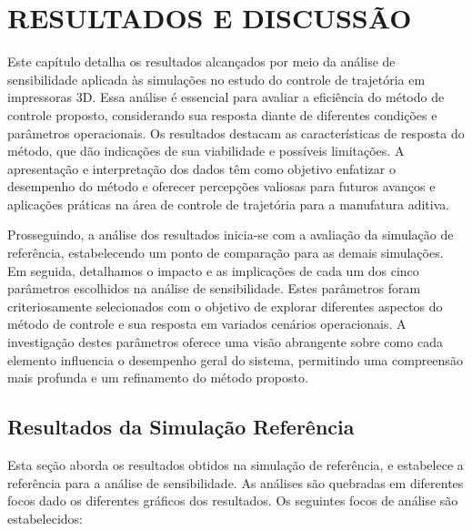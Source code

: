\chapter{RESULTADOS E DISCUSSÃO}
Este capítulo detalha os resultados alcançados por meio da análise de sensibilidade aplicada às simulações no estudo do controle de trajetória em impressoras 3D. Essa análise é essencial para avaliar a eficiência do método de controle proposto, considerando sua resposta diante de diferentes condições e parâmetros operacionais. Os resultados destacam as características de resposta do método, que dão indicações de sua viabilidade e possíveis limitações. A apresentação e interpretação dos dados têm como objetivo enfatizar o desempenho do método e oferecer percepções valiosas para futuros avanços e aplicações práticas na área de controle de trajetória para a manufatura aditiva.

Prosseguindo, a análise dos resultados inicia-se com a avaliação da simulação de referência, estabelecendo um ponto de comparação para as demais simulações. Em seguida, detalhamos o impacto e as implicações de cada um dos cinco parâmetros escolhidos na análise de sensibilidade. Estes parâmetros foram criteriosamente selecionados com o objetivo de explorar diferentes aspectos do método de controle e sua resposta em variados cenários operacionais. A investigação destes parâmetros oferece uma visão abrangente sobre como cada elemento influencia o desempenho geral do sistema, permitindo uma compreensão mais profunda e um refinamento do método proposto.

\section{Resultados da Simulação Referência}
Esta seção aborda os resultados obtidos na simulação de referência, e estabelece a referência para a análise de sensibilidade. As análises são quebradas em diferentes focos dado os diferentes gráficos dos resultados. Os seguintes focos de análise são estabelecidos:

